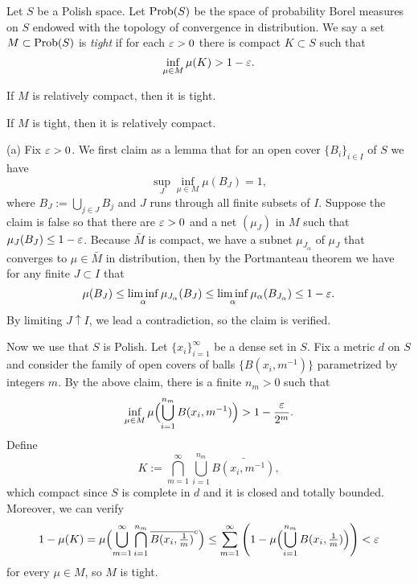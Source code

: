 \documentclass{../../large}
\begin{document}
\begin{prb}
Let $S$ be a Polish space.
Let $\operatorname{Prob}(S)$ be the space of probability Borel measures on $S$ endowed with the topology of convergence in distribution.
We say a set $M\subset\operatorname{Prob}(S)$ is \emph{tight} if for each $\varepsilon>0$ there is compact $K\subset S$ such that
\[\inf_{\mu\in M}\mu(K)>1-\varepsilon.\]
\begin{parts}
\item If $M$ is relatively compact, then it is tight.
\item If $M$ is tight, then it is relatively compact.
\end{parts}
\end{prb}
\begin{pf}
(a)
Fix $\varepsilon>0$.
We first claim as a lemma that for an open cover $\{B_i\}_{i\in I}$ of $S$ we have
\[\sup_J\inf_{\mu\in M}\mu(B_J)=1,\]
where $B_J:=\bigcup_{j\in J}B_j$ and $J$ runs through all finite subsets of $I$.
Suppose the claim is false so that there are $\varepsilon>0$ and a net $(\mu_J)$ in $M$ such that $\mu_J(B_J)\le1-\varepsilon$.
Because $\bar M$ is compact, we have a subnet $\mu_{J_\alpha}$ of $\mu_J$ that converges to $\mu\in\bar M$ in distribution, then by the Portmanteau theorem we have for any finite $J\subset I$ that
\[\mu(B_J)\le\liminf_\alpha\mu_{J_\alpha}(B_J)\le\liminf_\alpha\mu_\alpha(B_{J_\alpha})\le1-\varepsilon.\]
By limiting $J\uparrow I$, we lead a contradiction, so the claim is verified.

Now we use that $S$ is Polish.
Let $\{x_i\}_{i=1}^\infty$ be a dense set in $S$.
Fix a metric $d$ on $S$ and consider the family of open covers of balls $\{B(x_i,m^{-1})\}$ parametrized by integers $m$.
By the above claim, there is a finite $n_m>0$ such that
\[\inf_{\mu\in M}\mu\Bigl(\bigcup_{i=1}^{n_m}B(x_i,m^{-1})\Bigr)>1-\frac{\varepsilon}{2^m}.\]
Define
\[K:=\bigcap_{m=1}^\infty\bigcup_{i=1}^{n_m}\bar{B(x_i,m^{-1})},\]
which compact since $S$ is complete in $d$ and it is closed and totally bounded.
Moreover, we can verify
\[1-\mu(K)=\mu\Bigl(\bigcup_{m=1}^\infty\bigcap_{i=1}^{n_m}\overline{B(x_i,\tfrac1m)}^c\Bigr)\le\sum_{m=1}^\infty\left(1-\mu\Bigl(\bigcup_{i=1}^{n_m}B(x_i,\tfrac1m)\Bigr)\right)<\varepsilon\]
for every $\mu\in M$, so $M$ is tight.


\end{pf}
\end{document}
